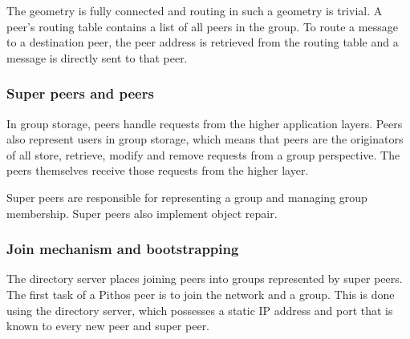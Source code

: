 The geometry is fully connected and routing in such a geometry is trivial. A peer's routing table contains a list of all peers in the group. To route a message to a destination peer, the peer address is retrieved from the routing table and a message is directly sent to that peer.

\subsubsection{Super peers and peers}

In group storage, peers handle requests from the higher application layers. Peers also represent users in group storage, which means that peers are the originators of all store, retrieve, modify and remove requests from a group perspective. The peers themselves receive those requests from the higher layer.

Super peers are responsible for representing a group and managing group membership. Super peers also implement object repair.

\subsubsection{Join mechanism and bootstrapping}
\label{join_mechanism_design}

The directory server places joining peers into groups represented by super peers. The first task of a Pithos peer is to join the network and a group. This is done using the directory server, which possesses a static IP address and port that is known to every new peer and super peer.

